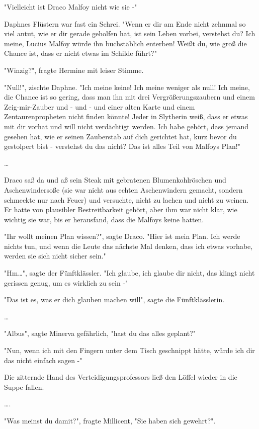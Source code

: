 {"Vielleicht ist Draco Malfoy nicht wie sie -"

Daphnes Flüstern war fast ein Schrei. "Wenn er dir am Ende nicht zehnmal so viel antut, wie er dir gerade geholfen hat, ist sein Leben vorbei, verstehst du? Ich meine, Lucius Malfoy würde ihn buchstäblich enterben! Weißt du, wie groß die Chance ist, dass er nicht etwas im Schilde führt?"

"Winzig?", fragte Hermine mit leiser Stimme.

"Null!", zischte Daphne. "Ich meine keine! Ich meine weniger als null! Ich meine, die Chance ist so gering, dass man ihn mit drei Vergrößerungszaubern und einem Zeig-mir-Zauber und - und - und einer alten Karte und einem Zentaurenpropheten nicht finden könnte! Jeder in Slytherin weiß, dass er etwas mit dir vorhat und will nicht verdächtigt werden. Ich habe gehört, dass jemand gesehen hat, wie er seinen Zauberstab auf dich gerichtet hat, kurz bevor du gestolpert bist - verstehst du das nicht? Das ist alles Teil von Malfoys Plan!"

…

Draco saß da und aß sein Steak mit gebratenen Blumenkohlröschen und Aschenwindersoße (sie war nicht aus echten Aschenwindern gemacht, sondern schmeckte nur nach Feuer) und versuchte, nicht zu lachen und nicht zu weinen. Er hatte von plausibler Bestreitbarkeit gehört, aber ihm war nicht klar, wie wichtig sie war, bis er herausfand, dass die Malfoys keine hatten.

"Ihr wollt meinen Plan wissen?", sagte Draco. "Hier ist mein Plan. Ich werde nichts tun, und wenn die Leute das nächste Mal denken, dass ich etwas vorhabe, werden sie sich nicht sicher sein."

"Hm…", sagte der Fünftklässler. "Ich glaube, ich glaube dir nicht, das klingt nicht gerissen genug, um es wirklich zu sein -"

"Das ist es, was er dich glauben machen will", sagte die Fünftklässlerin.

…

"Albus", sagte Minerva gefährlich, "hast du das alles geplant?"

"Nun, wenn ich mit den Fingern unter dem Tisch geschnippt hätte, würde ich dir das nicht einfach sagen -"

Die zitternde Hand des Verteidigungsprofessors ließ den Löffel wieder in die Suppe fallen.

….

"Was meinst du damit?", fragte Millicent, "Sie haben sich gewehrt?".

}
